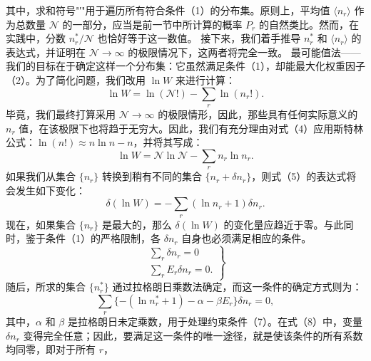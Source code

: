 其中，求和符号"′"用于遍历所有符合条件（1）的分布集。原则上，平均值 \(\langle n_{r}\rangle\) 作为总数量 \(\mathcal{N}\) 的一部分，应当是前一节中所计算的概率 \(P_{r}\) 的自然类比。然而，在实践中，分数 \(n_{r}^{*}/\mathcal{N}\) 也恰好等于这一数值。
接下来，我们着手推导 \(n_{r}^{*}\) 和 \(\langle n_{r}\rangle\) 的表达式，并证明在 \(\mathcal{N} \rightarrow \infty\) 的极限情况下，这两者将完全一致。
最可能值法——我们的目标在于确定这样一个分布集：它虽然满足条件（1），却能最大化权重因子（2）。为了简化问题，我们改用 \(\ln W\) 来进行计算：
\begin{equation}\tag{3.2.4}\label{eq:3.2.4}
\ln W = \ln ( \mathcal { N } ! ) - \sum _ { r } \ln ( n _ { r } ! ) .
\end{equation}
毕竟，我们最终打算采用 \(\mathcal{N} \rightarrow \infty\) 的极限情形，因此，那些具有任何实际意义的 \(n_{r}\) 值，在该极限下也将趋于无穷大。因此，我们有充分理由对式（4）应用斯特林公式：\(\ln(n!) \approx n \ln n - n\)，并将其写成：
\begin{equation}\tag{3.2.5}\label{eq:3.2.5}
\ln W = \mathcal { N } \ln \mathcal { N } - \sum _ { r } n _ { r } \ln n _ { r } .
\end{equation}
如果我们从集合 \(\{n_r\}\) 转换到稍有不同的集合 \(\{n_r + \delta n_r\}\)，则式（5）的表达式将会发生如下变化：
\begin{equation}\tag{3.2.6}\label{eq:3.2.6}
\delta ( \ln W ) = - \sum _ { r } ( \ln n _ { r } + 1 ) \delta n _ { r } .
\end{equation}
现在，如果集合 \(\{n_r\}\) 是最大的，那么 \(\delta(\ln W)\) 的变化量应趋近于零。与此同时，鉴于条件（1）的严格限制，各 \(\delta n_r\) 自身也必须满足相应的条件。
\begin{equation}\tag{3.2.7}\label{eq:3.2.7}
\left. \begin{array}{l} { { \displaystyle \sum _ { r } \delta n _ { r } = 0 } } \\{ { \displaystyle \sum _ { r } E _ { r } \delta n _ { r } = 0 . } } \end{array} \right\}
\end{equation}
随后，所求的集合 \(\{n_{r}^{*}\}\) 通过拉格朗日乘数法确定，而这一条件的确定方式则为：
\begin{equation}\tag{3.2.8}\label{eq:3.2.8}
\sum _ { r } \{ - ( \ln n _ { r } ^{*} + 1 ) - \alpha - \beta E _ { r } \} \delta n _ { r } = 0 ,
\end{equation}
其中，\(\alpha\) 和 \(\beta\) 是拉格朗日未定乘数，用于处理约束条件（7）。在式（8）中，变量 \(\delta n_{r}\) 变得完全任意；因此，要满足这一条件的唯一途径，就是使该条件的所有系数均同零，即对于所有 \(r\)，
